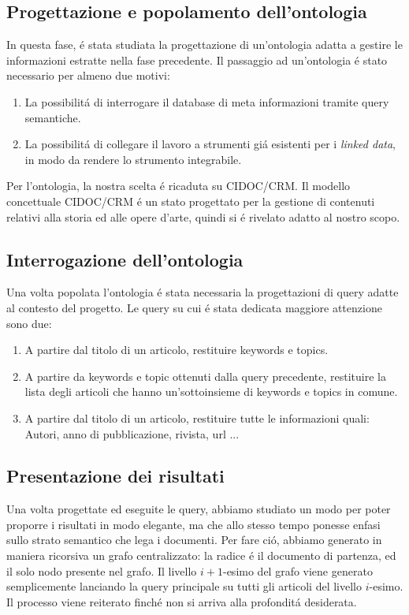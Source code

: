 \documentclass[11pt,a4paper]{article}
\begin{document}
\subsection{Progettazione e popolamento dell'ontologia}
\label{subsec:ontology}
In questa fase, \'e stata studiata la progettazione di un'ontologia adatta a gestire le informazioni estratte nella fase precedente. Il passaggio ad un'ontologia \'e stato necessario per almeno due motivi:
\begin{enumerate}
	\item La possibilit\'a di interrogare il database di meta informazioni tramite query semantiche.
	\item La possibilit\'a di collegare il lavoro a strumenti gi\'a esistenti per i \emph{linked data}, in modo da rendere lo strumento integrabile.
\end{enumerate}
Per l'ontologia, la nostra scelta \'e ricaduta su CIDOC/CRM\cite{CIDOC}. Il modello concettuale CIDOC/CRM \'e un stato progettato per la gestione di contenuti relativi alla storia ed alle opere d'arte, quindi si \'e rivelato adatto al nostro scopo. 


\subsection{Interrogazione dell'ontologia}
\label{subsec:query}
Una volta popolata l'ontologia \'e stata necessaria la progettazioni di query adatte al contesto del progetto. Le query su cui \'e stata dedicata maggiore attenzione sono due:
\begin{enumerate}
	\item A partire dal titolo di un articolo, restituire  keywords e topics.
	\item A partire da keywords e topic ottenuti dalla query precedente, restituire la lista degli articoli che hanno un'sottoinsieme di keywords e topics in comune. 
	\item A partire dal titolo di un articolo, restituire tutte le informazioni quali: Autori, anno di pubblicazione, rivista, url ...
\end{enumerate}

\subsection{Presentazione dei risultati}
\label{subsec:results}

Una volta progettate ed eseguite le query, abbiamo studiato un modo per poter proporre i risultati in modo elegante, ma che allo stesso tempo ponesse enfasi sullo strato semantico che lega i documenti. Per fare ci\'o, abbiamo generato in maniera ricorsiva un grafo centralizzato: la radice \'e il documento di partenza, ed il solo nodo presente nel grafo. Il livello $i+1$-esimo del grafo viene generato semplicemente lanciando la query principale su tutti gli articoli del livello $i$-esimo. Il processo viene reiterato finch\'e non si arriva alla profondit\'a desiderata.
\newpage
\end{document}
